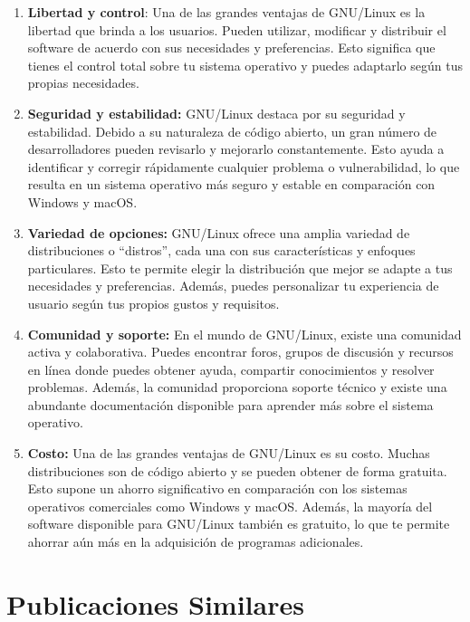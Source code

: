 \documentclass[
  jou,
  floatsintext,
  longtable,
  a4paper,
  nolmodern,
  notxfonts,
  notimes,
  colorlinks=true,linkcolor=blue,citecolor=blue,urlcolor=blue]{apa7}
\begin{document}
\begin{enumerate}
\def\labelenumi{\arabic{enumi}.}
\item
  \textbf{Libertad y control}: Una de las grandes ventajas de GNU/Linux
  es la libertad que brinda a los usuarios. Pueden utilizar, modificar y
  distribuir el software de acuerdo con sus necesidades y preferencias.
  Esto significa que tienes el control total sobre tu sistema operativo
  y puedes adaptarlo según tus propias necesidades.
\item
  \textbf{Seguridad y estabilidad:} GNU/Linux destaca por su seguridad y
  estabilidad. Debido a su naturaleza de código abierto, un gran número
  de desarrolladores pueden revisarlo y mejorarlo constantemente. Esto
  ayuda a identificar y corregir rápidamente cualquier problema o
  vulnerabilidad, lo que resulta en un sistema operativo más seguro y
  estable en comparación con Windows y macOS.
\item
  \textbf{Variedad de opciones:} GNU/Linux ofrece una amplia variedad de
  distribuciones o ``distros'', cada una con sus características y
  enfoques particulares. Esto te permite elegir la distribución que
  mejor se adapte a tus necesidades y preferencias. Además, puedes
  personalizar tu experiencia de usuario según tus propios gustos y
  requisitos.
\item
  \textbf{Comunidad y soporte:} En el mundo de GNU/Linux, existe una
  comunidad activa y colaborativa. Puedes encontrar foros, grupos de
  discusión y recursos en línea donde puedes obtener ayuda, compartir
  conocimientos y resolver problemas. Además, la comunidad proporciona
  soporte técnico y existe una abundante documentación disponible para
  aprender más sobre el sistema operativo.
\item
  \textbf{Costo:} Una de las grandes ventajas de GNU/Linux es su costo.
  Muchas distribuciones son de código abierto y se pueden obtener de
  forma gratuita. Esto supone un ahorro significativo en comparación con
  los sistemas operativos comerciales como Windows y macOS. Además, la
  mayoría del software disponible para GNU/Linux también es gratuito, lo
  que te permite ahorrar aún más en la adquisición de programas
  adicionales.
\end{enumerate}

\section{Publicaciones Similares}\label{publicaciones-similares}
\end{document}

